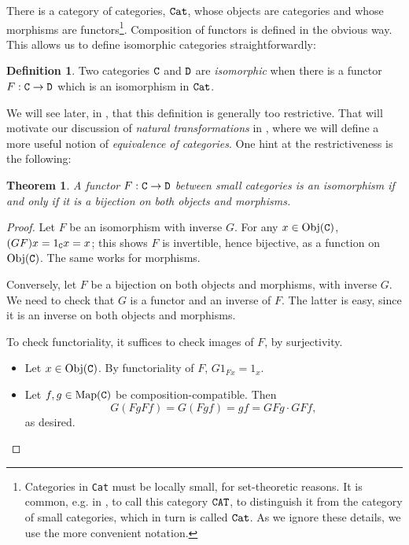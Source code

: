 \documentclass[11 pt]{amsart}
\theoremstyle{plain}   %
\newtheorem{thm}{Theorem}[section] %
\theoremstyle{definition}
\newtheorem{defn}{Definition}[section]
\theoremstyle{remark}
\numberwithin{equation}{section}
\newcommand{\cat}[1]{{\normalfont\texttt{#1}}}
\newcommand{\Obj}[1]{\text{Obj}(\cat{#1})}
\newcommand{\Map}[1]{\text{Map}(\cat{#1})}
\begin{document}
There is a category of categories, $\cat{Cat}$, whose objects are categories and
whose morphisms are functors\footnote{Categories in \cat{Cat} must be locally
	small, for set-theoretic reasons. It is common, e.g. in \cite{Riehl}, to call
	this category $\cat{CAT}$, to distinguish it from the category of small
	categories, which in turn is called $\cat{Cat}$. As we ignore these details, we
	use the more convenient notation.}. Composition of functors is defined in the
obvious way. This allows us to define isomorphic categories straightforwardly:

\begin{defn}
	Two categories $\cat{C}$ and $\cat{D}$ are \emph{isomorphic} when there is a
	functor $F: \cat{C}\rightarrow\cat{D}$ which is an isomorphism in $\cat{Cat}$.
\end{defn}

We will see later, in , that
this definition is generally too restrictive. That will motivate our discussion of
\emph{natural transformations} in , where we will
define a more useful notion of \emph{equivalence of categories}. One hint at the
restrictiveness is the following:

\begin{thm}\label{isomorphisms are bijections}\cite[Theorem 6.4.3]{Brown}
	A functor $F: \cat{C}\rightarrow\cat{D}$ between small categories is an
	isomorphism if and only if it is a bijection on both objects and
	morphisms.
\end{thm}

\begin{proof}
	Let $F$ be an isomorphism with inverse $G$. For any $x\in\Obj{C}$, $(GF)x =
		1_\cat{C}x = x$; this shows $F$ is invertible, hence bijective, as a function
	on $\Obj{C}$. The same works for morphisms.

	Conversely, let $F$ be a bijection on both objects and morphisms, with inverse
	$G$. We need to check that $G$ is a functor and an inverse of $F$. The latter
	is easy, since it is an inverse on both objects and morphisms.

	To check functoriality, it suffices to check images of $F$, by surjectivity.
	\begin{itemize}
		\item Let $x\in\Obj{C}$. By functoriality of $F$, $G1_{Fx} = 1_x$.
		\item Let $f,g\in\Map{C}$ be composition-compatible. Then $$G(FgFf) = G(Fgf)
			      = gf = GFg\cdot GFf,$$ as desired. \qedhere
	\end{itemize}
\end{proof}
\end{document}
